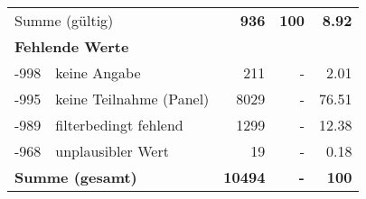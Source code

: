 \begin{longtable}{lXrrr}
     \midrule
     \multicolumn{2}{l}{Summe (gültig)} &
       \textbf{\num{936}} &
     \textbf{\num{100}} &
       \textbf{\num[round-mode=places,round-precision=2]{8.92}} \\
     \multicolumn{5}{l}{\textbf{Fehlende Werte}}\\
       -998 &
       keine Angabe &
         \num{211} &
        - &
         \num[round-mode=places,round-precision=2]{2.01} \\
       -995 &
       keine Teilnahme (Panel) &
         \num{8029} &
        - &
         \num[round-mode=places,round-precision=2]{76.51} \\
       -989 &
       filterbedingt fehlend &
         \num{1299} &
        - &
         \num[round-mode=places,round-precision=2]{12.38} \\
       -968 &
       unplausibler Wert &
         \num{19} &
        - &
         \num[round-mode=places,round-precision=2]{0.18} \\
     \midrule
     \multicolumn{2}{l}{\textbf{Summe (gesamt)}} &
          \textbf{\num{10494}} &
        \textbf{-} &
        \textbf{\num{100}} \\
     \bottomrule
     \end{longtable}
     
